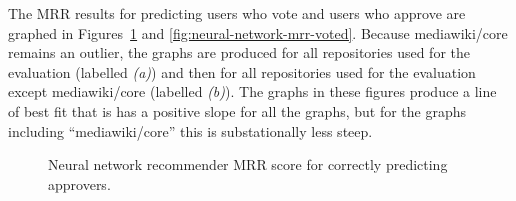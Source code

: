 The MRR results for predicting users who vote and users who approve are graphed in Figures~\ref{fig:neural-network-mrr-approved} and \ref{fig:neural-network-mrr-voted}. Because mediawiki/core remains an outlier, the graphs are produced for all repositories used for the evaluation (labelled \emph{(a)}) and then for all repositories used for the evaluation except mediawiki/core (labelled \emph{(b)}). The graphs in these figures produce a line of best fit that is has a positive slope for all the graphs, but for the graphs including ``mediawiki/core'' this is substationally less steep.

\begin{figure}[H]%
    \centering
    \caption{Neural network recommender MRR score for correctly predicting approvers.}%
    \label{fig:neural-network-mrr-approved}%
\end{figure}

